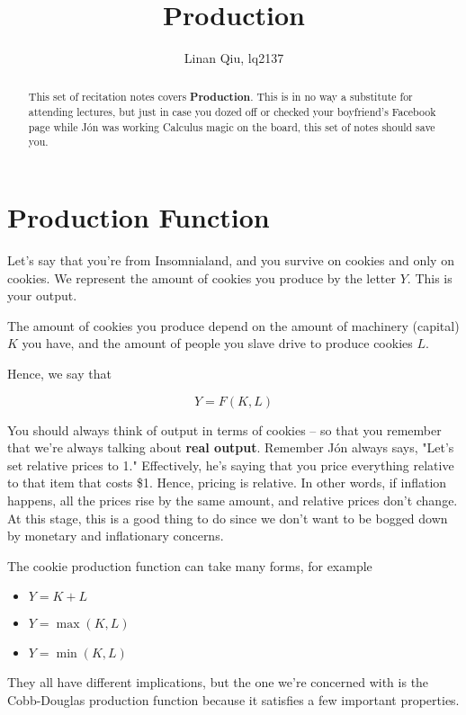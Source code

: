 \documentclass[11pt]{scrartcl}
\title{Production}
\author{Linan Qiu, lq2137}
\newcommand{\jon}{Jón }
\begin{document}
\maketitle

\begin{abstract}
This set of recitation notes covers \textbf{Production}. This is in no way a substitute for attending lectures, but just in case you dozed off or checked your boyfriend's Facebook page while \jon was working Calculus magic on the board, this set of notes should save you.
\end{abstract}

\section{Production Function}

Let's say that you're from Insomnialand, and you survive on cookies and only on cookies. We represent the amount of cookies you produce by the letter $Y$. This is your output.

The amount of cookies you produce depend on the amount of machinery (capital) $K$ you have, and the amount of people you slave drive to produce cookies $L$. 

Hence, we say that 

\[Y = F(K,L) \]

You should always think of output in terms of cookies -- so that you remember that we're always talking about \textbf{real output}. Remember \jon always says, "Let's set relative prices to 1." Effectively, he's saying that you price everything relative to that item that costs \$1. Hence, pricing is relative. In other words, if inflation happens, all the prices rise by the same amount, and relative prices don't change. At this stage, this is a good thing to do since we don't want to be bogged down by monetary and inflationary concerns.

The cookie production function can take many forms, for example

\begin{itemize}
	\item $Y = K + L$
	\item $Y = \max (K,L)$
	\item $Y = \min (K,L)$
\end{itemize}

They all have different implications, but the one we're concerned with is the Cobb-Douglas production function because it satisfies a few important properties.
\end{document}
